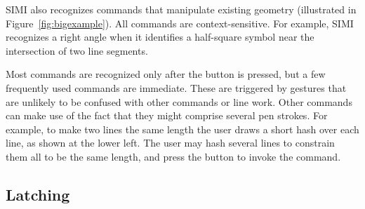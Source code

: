 \documentclass{chi-ext}
\begin{document}
SIMI also recognizes commands that manipulate existing geometry
(illustrated in Figure~\ref{fig:bigexample}). All commands are
context-sensitive. For example, SIMI recognizes a right angle when it
identifies a half-square symbol near the intersection of two line
segments.

Most commands are recognized only after the button is pressed, but a
few frequently used commands are immediate. These are triggered by
gestures that are unlikely to be confused with other commands or line
work. Other commands can make use of the fact that they might comprise
several pen strokes. For example, to make two lines the same length
the user draws a short hash over each line, as shown at the lower
left. The user may hash several lines to constrain them all to be the
same length, and press the button to invoke the command.

\subsection{Latching}


\end{document}

